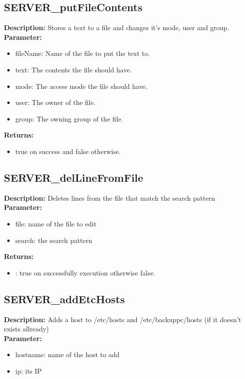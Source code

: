 \subsection{SERVER\_putFileContents}
\textbf{Description:} Stores a text to a file and changes it's mode, user and group.\\
\textbf{Parameter:}
\begin{itemize}
\item fileName: Name of the file to put the text to.
\item text: The contents the file should have.
\item mode: The access mode the file should have.
\item user: The owner of the file.
\item group: The owning group of the file.
\end{itemize}
\textbf{Returns:}
\begin{itemize}
\item true on success and false otherwise.
\end{itemize}

\subsection{SERVER\_delLineFromFile}
\textbf{Description:} Deletes lines from the file that match the search pattern\\
\textbf{Parameter:}
\begin{itemize}
\item file: name of the file to edit
\item search: the search pattern
\end{itemize}
\textbf{Returns:}
\begin{itemize}
\item : true on successfully execution otherwise false.
\end{itemize}

\subsection{SERVER\_addEtcHosts}
\textbf{Description:} Adds a host to /etc/hosts and /etc/backuppc/hosts (if it doesn't exists allready)\\
\textbf{Parameter:}
\begin{itemize}
\item hostname: name of the host to add
\item ip: its IP
\end{itemize}

